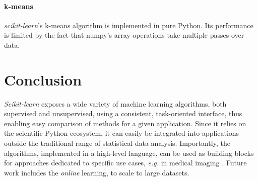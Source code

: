 \documentclass[twoside,11pt]{article}
\begin{document}
\paragraph{k-means}
%
\emph{scikit-learn}'s k-means algorithm is implemented in pure
Python.  Its performance is limited by the fact that numpy's
array operations take multiple passes over data.

\section{Conclusion}

\emph{Scikit-learn} exposes a wide variety of machine learning
algorithms, both supervised and unsupervised, using a consistent,
task-oriented interface, thus enabling easy comparison of methods for a
given application.
%
Since it relies on the scientific Python ecosystem, it can easily be
integrated into applications outside the traditional range of statistical
data analysis. Importantly, the algorithms, implemented in a high-level
language, can be used as building blocks for approaches dedicated to
specific use cases, \emph{e.g.} in medical imaging \citep{Michel2011}.
%
Future work includes the \emph{online} learning, to scale to
large datasets.


\end{document}
